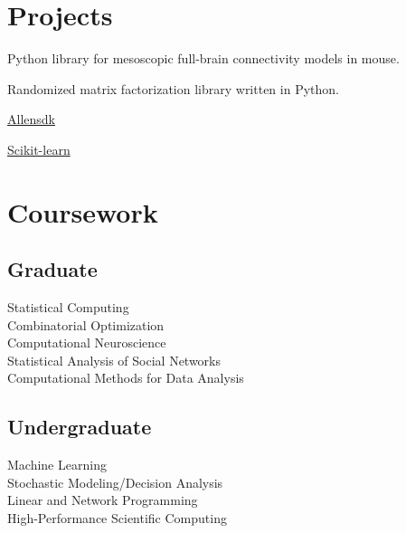 \documentclass[]{deedy-resume-openfont}
\begin{document}
\begin{minipage}[t]{0.35\textwidth}

\section{Projects}
Python library for mesoscopic full-brain connectivity models in mouse.
\sectionsep

Randomized matrix factorization library written in Python.
\sectionsep

\vspace{\topsep}
\begin{tightemize}
\item \href{https://github.com/alleninstitute/allensdk}{Allensdk}
\item \href{https://github.com/scikit-learn/scikit-learn}{Scikit-learn}
\end{tightemize}
\sectionsep



\section{Coursework}
\subsection{Graduate}
Statistical Computing \\
Combinatorial Optimization \\
Computational Neuroscience \\
Statistical Analysis of Social Networks \\
Computational Methods for Data Analysis \\
\sectionsep

\subsection{Undergraduate}
Machine Learning \\
Stochastic Modeling/Decision Analysis \\
Linear and Network Programming \\
High-Performance Scientific Computing \\



\end{minipage}
\end{document}
